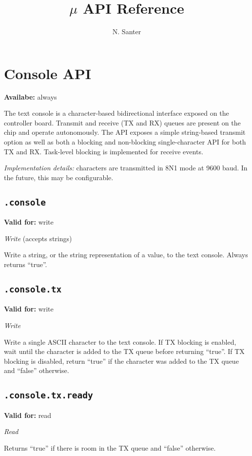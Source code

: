\documentclass{article}
\title{$\mu$ API Reference}
\author{N. Santer}
\begin{document}
\maketitle

\tableofcontents

\clearpage

\section{Console API}
\textbf{Availabe:} always

The text console is a character-based bidirectional interface exposed on the controller board. Transmit and receive (TX and RX) queues are present on the chip and operate autonomously.
The API exposes a simple string-based transmit option as well as both a blocking and non-blocking single-character API for both TX and RX. Task-level blocking is implemented for receive events.

\textit{Implementation details:} characters are transmitted in 8N1 mode at 9600 baud. In the future, this may be configurable.

\subsection{\texttt{.console}}
\textbf{Valid for:} write

\textit{Write} (accepts strings)

Write a string, or the string representation of a value, to the text console. Always returns ``true''.

\subsection{\texttt{.console.tx}}
\textbf{Valid for:} write

\textit{Write}

Write a single ASCII character to the text console. If TX blocking is enabled, wait until the character is added to the TX queue before returning ``true''.
If TX blocking is disabled, return ``true'' if the character was added to the TX queue and ``false'' otherwise.

\subsection{\texttt{.console.tx.ready}}
\textbf{Valid for:} read

\textit{Read}

Returns ``true'' if there is room in the TX queue and ``false'' otherwise.
\end{document}

